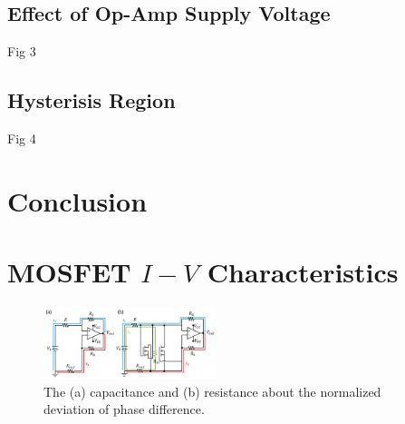\documentclass[%
 aip,
amsmath,amssymb,
reprint,
]{revtex4-1}
\begin{document}
\subsection{Effect of Op-Amp Supply Voltage}
Fig 3
\subsection{Hysterisis Region}
Fig 4

\section{\label{sec:Conclusion} Conclusion}

\appendix

\section{\label{mosfetiv}MOSFET $I-V$ Characteristics}
\begin{figure}[!h]
  \centering
  \includegraphics[width=0.45\textwidth]{./figures/TheoryCalc.png}
  \caption{The (a) capacitance and (b) resistance about the normalized deviation of phase difference. }
  \label{fig:stdphiandRC}
\end{figure}
\end{document}
